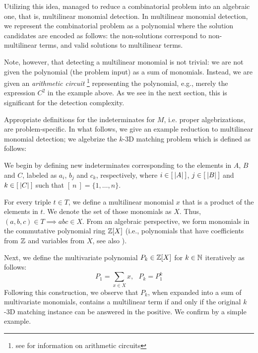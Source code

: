 Utilizing this idea, \textcite{Koutis05} 
managed to reduce a combinatorial problem 
into an algebraic one, that is, multilinear monomial detection. 
In multilinear monomial detection, we represent the combinatorial problem 
as a polynomial where the solution candidates are encoded as follows: 
the non-solutions correspond to non-multilinear terms, 
and valid solutions to multilinear terms. 

Note, however, that detecting a multilinear monomial is not trivial: 
we are not given the polynomial (the problem input) as a sum of monomials. 
Instead, we are given an \emph{arithmetic circuit}
\footnote{see  for information on arithmetic circuits} 
representing the polynomial, 
e.g., merely the expression $C^2$ in the example above. 
As we see in the next section, this is significant for the detection complexity.

Appropriate definitions for the indeterminates for $M$,
i.e. proper algebrizations, are problem-specific. 
In what follows, we give an example 
reduction to multilinear monomial detection; 
we algebrize the $k$-3D matching problem which is defined as follows:
\begin{problem}
\end{problem}

We begin by defining new indeterminates corresponding to the elements in $A$, $B$ and $C$, 
labeled as $a_i$, $b_j$ and $c_k$, respectively, where $i\in [\:{\left\vert A\right\vert}\:]$, $j\in
[\:{\left\vert B\right\vert}\:]$ and $k\in [\:{\left\vert C\right\vert}\:]$ such that $[\:n\:] = \{1,\ldots,n\}$. 

For every triple $t \in T$, we define a multilinear monomial $x$ that is a
product of the elements in $t$. 
We denote the set of those monomials as $X$. 
Thus, $(a,b,c) \in T \implies abc \in X$.
From an algebraic perspective, we form monomials in the commutative polynomial 
ring $\mathbb Z[X]$ (i.e., polynomials that have coefficients from $\mathbb Z$ and variables from $X$, 
see also ).

Next, we define the multivariate polynomial 
$P_k \in \mathbb Z[X]$ for $k \in \mathbb N$ iteratively 
as follows: 
\[
  P_1 = \displaystyle \sum_{x \in X}x, \: \: \: P_k = P_1^k
\]
Following this construction, we observe that $P_k$, 
when expanded into a sum of multivariate monomials, 
contains a multilinear term if and only if the original 
$k$-3D matching instance can be answered in the positive. 
We confirm by a simple example. 

